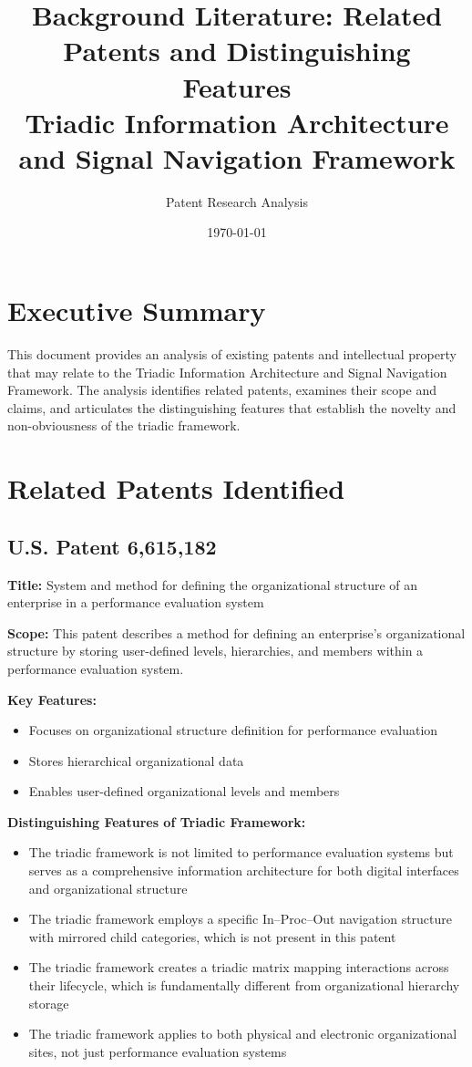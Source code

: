 \documentclass[11pt,a4paper]{article}
\title{Background Literature: Related Patents and Distinguishing Features\\
Triadic Information Architecture and Signal Navigation Framework}
\author{Patent Research Analysis}
\date{\today}
\begin{document}
\maketitle

\section*{Executive Summary}

This document provides an analysis of existing patents and intellectual property that may relate to the Triadic Information Architecture and Signal Navigation Framework. The analysis identifies related patents, examines their scope and claims, and articulates the distinguishing features that establish the novelty and non-obviousness of the triadic framework.

\section*{Related Patents Identified}

\subsection*{U.S. Patent 6,615,182}
\textbf{Title:} System and method for defining the organizational structure of an enterprise in a performance evaluation system

\textbf{Scope:} This patent describes a method for defining an enterprise's organizational structure by storing user-defined levels, hierarchies, and members within a performance evaluation system.

\textbf{Key Features:}
\begin{itemize}[noitemsep]
  \item Focuses on organizational structure definition for performance evaluation
  \item Stores hierarchical organizational data
  \item Enables user-defined organizational levels and members
\end{itemize}

\textbf{Distinguishing Features of Triadic Framework:}
\begin{itemize}[noitemsep]
  \item The triadic framework is not limited to performance evaluation systems but serves as a comprehensive information architecture for both digital interfaces and organizational structure
  \item The triadic framework employs a specific In--Proc--Out navigation structure with mirrored child categories, which is not present in this patent
  \item The triadic framework creates a triadic matrix mapping interactions across their lifecycle, which is fundamentally different from organizational hierarchy storage
  \item The triadic framework applies to both physical and electronic organizational sites, not just performance evaluation systems
\end{itemize}
\end{document}
